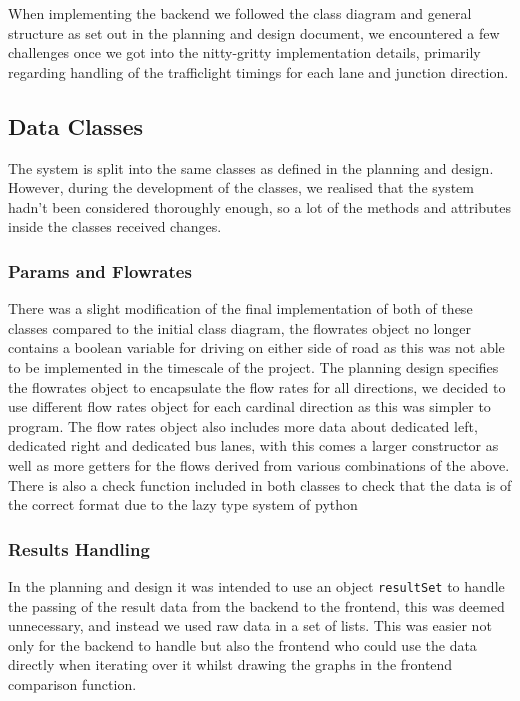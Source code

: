 \documentclass{article}
\begin{document}
    When implementing the backend we followed the class diagram and general structure as set out in the planning and
    design document, we encountered a few challenges once we got into the nitty-gritty implementation details, primarily
    regarding handling of the trafficlight timings for each lane and junction direction.

    \subsection{Data Classes}

    The system is split into the same classes as defined in the planning and design. However, during the development of the
    classes, we realised that the system hadn’t been considered thoroughly enough, so a lot of the methods and attributes
    inside the classes received changes.

    \subsubsection{Params and Flowrates}

    There was a slight modification of the final implementation of both of these classes compared to the initial class
    diagram, the flowrates object no longer contains a boolean variable for driving on either side of road as this was
    not able to be implemented in the timescale of the project. The planning design specifies the flowrates object to
    encapsulate the flow rates for all directions, we decided to use different flow rates object for each cardinal
    direction as this was simpler to program. The flow rates object also includes more data about dedicated left,
    dedicated right and dedicated bus lanes, with this comes a larger constructor as well as more getters for the
    flows derived from various combinations of the above. There is also a check function included in both classes to
    check that the data is of the correct format due to the lazy type system of python

    \subsubsection{Results Handling}

    In the planning and design it was intended to use an object \texttt{resultSet} to handle the passing of the result
    data from the backend to the frontend, this was deemed unnecessary, and instead we used raw data in a set of lists.
    This was easier not only for the backend to handle but also the frontend who could use the data directly when iterating
    over it whilst drawing the graphs in the frontend comparison function.
\end{document}
